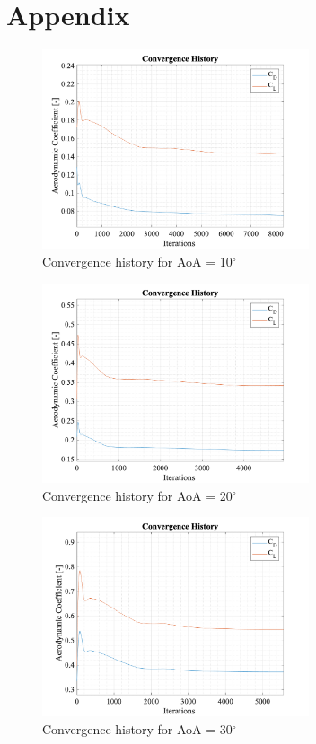 \section*{Appendix}

\begin{figure}[H]
 \centering
 \includegraphics[width=0.7\textwidth]{matlab_images/10_conv_history.png}
 \caption{Convergence history for AoA = 10$^\circ$}
 \label{fig: conv_hist_10}
\end{figure}

\begin{figure}[H]
 \centering
 \includegraphics[width=0.7\textwidth]{matlab_images/20_conv_history.png}
 \caption{Convergence history for AoA = 20$^\circ$}
 \label{fig: conv_hist_20}
\end{figure}

\begin{figure}[H]
 \centering
 \includegraphics[width=0.7\textwidth]{matlab_images/30_conv_history.png}
 \caption{Convergence history for AoA = 30$^\circ$}
 \label{fig: conv_hist_30}
\end{figure}

